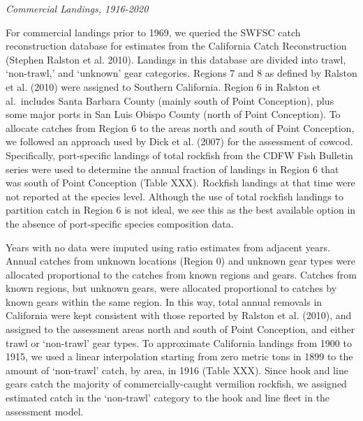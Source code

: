 \documentclass[11pt,
  english,
  a4paper,
]{article}
\begin{document}
\emph{Commercial Landings, 1916-2020}

For commercial landings prior to 1969, we queried the SWFSC catch reconstruction database for estimates from the California Catch Reconstruction {(Stephen Ralston et al. 2010)\leavevmode\tagmcend\tagstructend}. Landings in this database are divided into trawl, `non-trawl,' and `unknown' gear categories. Regions 7 and 8 as defined by Ralston et al. {(2010)\leavevmode\tagmcend\tagstructend} were assigned to Southern California. Region 6 in Ralston et al.~includes Santa Barbara County (mainly south of Point Conception), plus some major ports in San Luis Obispo County (north of Point Conception). To allocate catches from Region 6 to the areas north and south of Point Conception, we followed an approach used by Dick et al. {(2007)\leavevmode\tagmcend\tagstructend} for the assessment of cowcod. Specifically, port-specific landings of total rockfish from the CDFW Fish Bulletin series were used to determine the annual fraction of landings in Region 6 that was south of Point Conception (Table XXX). Rockfish landings at that time were not reported at the species level. Although the use of total rockfish landings to partition catch in Region 6 is not ideal, we see this as the best available option in the absence of port-specific species composition data.

Years with no data were imputed using ratio estimates from adjacent years. Annual catches from unknown locations (Region 0) and unknown gear types were allocated proportional to the catches from known regions and gears. Catches from known regions, but unknown gears, were allocated proportional to catches by known gears within the same region. In this way, total annual removals in California were kept consistent with those reported by Ralston et al. {(2010)\leavevmode\tagmcend\tagstructend}, and assigned to the assessment areas north and south of Point Conception, and either trawl or `non-trawl' gear types. To approximate California landings from 1900 to 1915, we used a linear interpolation starting from zero metric tons in 1899 to the amount of `non-trawl' catch, by area, in 1916 (Table XXX). Since hook and line gears catch the majority of commercially-caught vermilion rockfish, we assigned estimated catch in the `non-trawl' category to the hook and line fleet in the assessment model.
\end{document}
